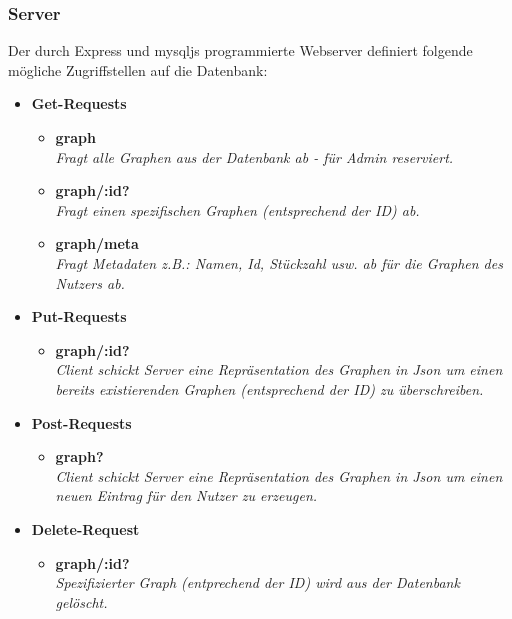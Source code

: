 \documentclass[twoside]{report}
\begin{document}
\subsubsection{Server}

Der durch Express und mysqljs programmierte Webserver definiert folgende mögliche Zugriffstellen auf die Datenbank:
\begin{itemize}
  \item \textbf{Get-Requests}
        \begin{itemize}
          \item \textbf{graph}
                \\\textit{Fragt alle Graphen aus der Datenbank ab - für Admin reserviert.}
          \item \textbf{graph/:id?}
                \\\textit{Fragt einen spezifischen Graphen (entsprechend der ID) ab.}
          \item \textbf{graph/meta}
                \\\textit{Fragt Metadaten z.B.: Namen, Id, Stückzahl usw. ab für die Graphen des Nutzers ab.}
        \end{itemize}
  \item  \textbf{Put-Requests}
        \begin{itemize}
          \item \textbf{graph/:id?}
                \\\textit{Client schickt Server eine Repräsentation des Graphen in Json um einen bereits existierenden Graphen (entsprechend der ID) zu überschreiben.}
        \end{itemize}
  \item \textbf{Post-Requests}
        \begin{itemize}
          \item \textbf{graph?}
                \\\textit{Client schickt Server eine Repräsentation des Graphen in Json um einen neuen Eintrag für den Nutzer zu erzeugen.}
        \end{itemize}
  \item \textbf{Delete-Request}
        \begin{itemize}
          \item \textbf{graph/:id?}
                \\\textit{Spezifizierter Graph (entprechend der ID) wird aus der Datenbank gelöscht.}
        \end{itemize}
\end{itemize}
\end{document}
